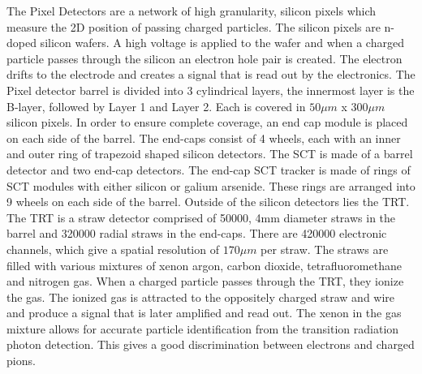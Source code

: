 \indent The Pixel Detectors are a network of high granularity, silicon pixels which measure the 2D position of passing charged particles. The silicon pixels are n-doped silicon wafers. A high voltage is applied to the wafer and when a charged particle passes through the silicon an electron hole pair is created. The electron drifts to the electrode and creates a signal that is read out by the electronics.  The Pixel detector barrel is divided into 3 cylindrical layers, the innermost layer is the B-layer, followed by Layer 1 and Layer 2. Each is covered in ${50\mu{m}}$ x ${300\mu{m}}$ silicon pixels. In order to ensure complete coverage, an end cap module is placed on each side of the barrel. The end-caps consist of 4 wheels, each with an inner and outer ring of trapezoid shaped silicon detectors. \linebreak
\indent The SCT is made of a barrel detector and two end-cap detectors. 
The end-cap SCT tracker is made of rings of SCT modules with either silicon or galium arsenide. These rings are arranged into 9 wheels on each side of the barrel.\linebreak
\indent Outside of the silicon detectors lies the TRT. The TRT is a straw detector comprised of 50000, 4mm diameter straws in the barrel and 320000 radial straws in the end-caps. There are 420000 electronic channels, which give a spatial resolution of ${170\mu{m}}$ per straw. The straws are filled with various mixtures of xenon argon, carbon dioxide, tetrafluoromethane and nitrogen gas. When a charged particle passes through the TRT, they ionize the gas. The ionized gas is attracted to the oppositely charged straw and wire and produce a signal that is later amplified and read out. The xenon in the gas mixture allows for accurate particle identification from the transition radiation photon detection.  This gives a good discrimination between electrons and charged pions.

